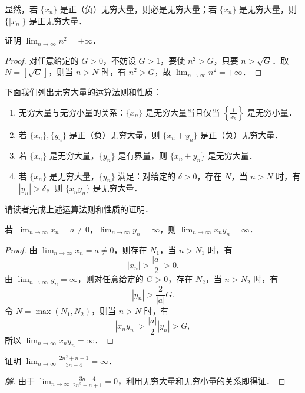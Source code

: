 显然，若 $\{x_n\}$ 是正（负）无穷大量，则必是无穷大量；若 $\{x_n\}$ 是无穷大量，则 $\{|x_n|\}$ 是正无穷大量．

\begin{example}\label{ex:3-2-17}
证明 $\lim_{n\to\infty}n^2 = +\infty$．
\end{example}

\begin{proof}
对任意给定的 $G > 0$，不妨设 $G > 1$，要使 $n^2 > G$，只要 $n > \sqrt{G}$．取 $N = [\sqrt{G}]$，则当 $n > N$ 时，有 $n^2 > G$，故 $\lim_{n\to\infty} n^2 = +\infty$．
\end{proof}

下面我们列出无穷大量的运算法则和性质：
\begin{enumerate}
\item 无穷大量与无穷小量的关系：$\{x_n\}$ 是无穷大量当且仅当 $\left\{\frac{1}{x_n}\right\}$ 是无穷小量．
\item 若 $\{x_n\},\{y_n\}$ 是正（负）无穷大量，则 $\{x_n + y_n\}$ 是正（负）无穷大量．
\item 若 $\{x_n\}$ 是无穷大量，$\{y_n\}$ 是有界量，则 $\{x_n \pm y_n\}$ 是无穷大量．
\item 若 $\{x_n\}$ 是无穷大量，$\{y_n\}$ 满足：对给定的 $\delta > 0$，存在 $N$，当 $n > N$ 时，有 $|y_n| > \delta$，则 $\{x_n y_n\}$ 是无穷大量．
\end{enumerate}

请读者完成上述运算法则和性质的证明．

\begin{example}\label{ex:3-2-18}
若 $\lim_{n\to\infty}x_n = a \neq 0$，$\lim_{n\to\infty}y_n = \infty$，则 $\lim_{n\to\infty}x_n y_n = \infty$．
\end{example}

\begin{proof}
由 $\lim_{n\to\infty}x_n = a \neq 0$，则存在 $N_1$，当 $n>N_1$ 时，有
\[
|x_n| > \frac{|a|}{2} > 0.
\]
由 $\lim_{n\to\infty}y_n = \infty$，则对任意给定的 $G>0$，存在 $N_2$，当 $n>N_2$ 时，有
\[
|y_n| > \frac{2}{|a|}G.
\]
令 $N = \max(N_1, N_2)$，则当 $n > N$ 时，有
\[
|x_n y_n| > \frac{|a|}{2}|y_n| > G,
\]
所以 $\lim_{n\to\infty}x_n y_n = \infty$．
\end{proof}

\begin{example}\label{ex:3-2-19}
证明 $\lim_{n\to\infty}\frac{2n^2+n+1}{3n-4} = \infty$．
\end{example}

\begin{proof}[解]
由于 $\lim_{n\to\infty}\frac{3n-4}{2n^2+n+1} = 0$，利用无穷大量和无穷小量的关系即得证．
\end{proof}

